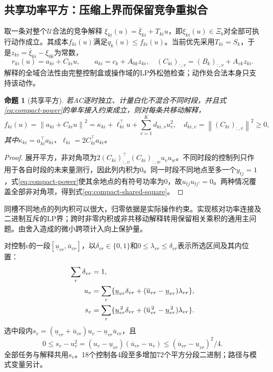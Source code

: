 \documentclass[UTF8,fontset=fandol,11pt,a4paper]{ctexart}
\newtheorem{proposition}{命题}
\newcommand{\norm}[1]{\left\lVert#1\right\rVert}
\begin{document}
\subsection{共享功率平方：压缩上界而保留竞争重拟合}
取一条对整个$\mathcal U$合法的竞争解释
$\xi_{ki}(u)=\bar\xi_{ki}+T_{ki}u$，即$\xi_{ki}(u)\in\Xi_b$对全部可执行动作成立。其成本$f_{ki}(u)$满足$q_k(u)\le f_{ki}(u)$。当前优先采用$T_{ki}=S_k$，于是$z_{ki}=\bar\xi_{ki}-\xi_{0k}$为常数，
\begin{equation}
 r_{ki}(u)=a_{ki}+C_{ki}u,\qquad
 a_{ki}=c_k+A_{0k}z_{ki},\quad
 (C_{ki})_{:,v}=(B_k)_{:,v}+A_{vk}z_{ki}.
 \label{eq:compact-affine-witness}
\end{equation}
解释的全域合法性由完整控制盒或操作域的LP外松弛检查；动作处合法本身只支持该动作。

\begin{proposition}[共享平方]
若AC逐时独立、计量白化不混合不同时段，并且式\eqref{eq:compact-power}的单车接入约束成立，则对每条共移动解释，
\begin{equation}
 f_{ki}(u)=\norm{a_{ki}+C_{ki}u}^2
 =\kappa_{ki}+\ell_{ki}^{\top}u+\sum_{v=1}^K d_{ki,v}u_v^2,
 \quad d_{ki,v}=\norm{(C_{ki})_{:,v}}^2\ge0,
 \label{eq:compact-shared-square}
\end{equation}
其中$\kappa_{ki}=a_{ki}^{\top}a_{ki}$、$\ell_{ki}=2C_{ki}^{\top}a_{ki}$。
\end{proposition}
\begin{proof}
展开平方，非对角项为$2(C_{ki})_{:,v}^{\top}(C_{ki})_{:,w}u_vu_w$。不同时段的控制列只作用于各自时段的未来量测行，因此列内积为0。同一时段不同地点至多一个$y_{tj}=1$，式\eqref{eq:compact-power}使其余地点的有符号功率为0，故$u_{tj}u_{tj'}=0$。两种情况覆盖全部非对角项，得到式\eqref{eq:compact-shared-square}。
\end{proof}
同槽不同地点的列内积可以很大，归零依据是实际操作约束。实现核对功率连接及二进制互斥的LP界；跨时非零内积或非共移动解释转用保留相关乘积的通用主问题。由舍入造成的微小跨项计入向上保护量。

对控制$v$的一段$[\underline u_{vr},\overline u_{vr}]$，以$\delta_{vr}\in\{0,1\}$和$0\le\lambda_{vr}\le\delta_{vr}$表示所选区间及其内位置：
\begin{align}
 \sum_r\delta_{vr}&=1,\notag\\
 u_v&=\sum_r\{\underline u_{vr}\delta_{vr}
       +(\overline u_{vr}-\underline u_{vr})\lambda_{vr}\},\notag\\
 s_v&=\sum_r\{\underline u_{vr}^{\,2}\delta_{vr}
       +(\overline u_{vr}^{\,2}-\underline u_{vr}^{\,2})\lambda_{vr}\}.
 \label{eq:compact-square-grid}
\end{align}
选中段内$s_v=(\underline u_{vr}+\overline u_{vr})u_v-\underline u_{vr}\overline u_{vr}$，且
\begin{equation}
 0\le s_v-u_v^2
   =(u_v-\underline u_{vr})(\overline u_{vr}-u_v)
   \le(\overline u_{vr}-\underline u_{vr})^2/4.
 \label{eq:compact-chord-error}
\end{equation}
全部任务与解释共用$s_v$。18个控制各4段至多增加72个平方分段二进制；路径与模式变量另计。
\end{document}
